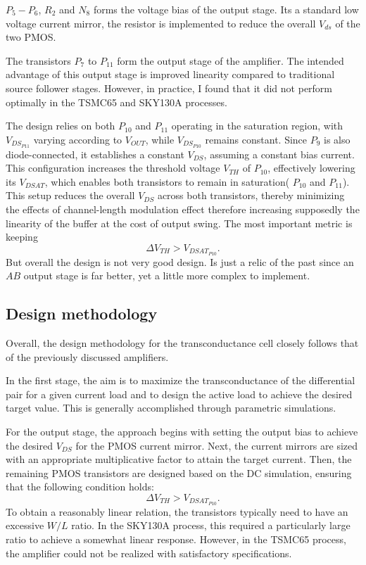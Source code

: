 \documentclass[12pt]{article}
\begin{document}
$P_5 - P_6$, $R_2$ and $N_8$ forms the voltage bias of the output stage. Its a standard low voltage current mirror, the resistor is implemented to reduce the overall $V_{ds}$ of the two PMOS.

The transistors $P_7$ to $P_{11}$ form the output stage of the amplifier. The intended advantage of this output stage is improved linearity compared to traditional source follower stages. However, in practice, I found that it did not perform optimally in the TSMC65 and SKY130A processes.

The design relies on both $P_{10}$ and $P_{11}$ operating in the saturation region, with $V_{DS_{P11}}$ varying according to $V_{OUT}$, while $V_{DS_{P10}}$ remains constant. Since $P_9$ is also diode-connected, it establishes a constant $V_{DS}$, assuming a constant bias current. This configuration increases the threshold voltage $V_{TH}$ of $P_{10}$, effectively lowering its $V_{DSAT}$, which enables both transistors to remain in saturation( $P_{10}$ and $P_{11}$). This setup reduces the overall $V_{DS}$ across both transistors, thereby minimizing the effects of channel-length modulation effect therefore increasing supposedly the linearity of the buffer at the cost of output swing.
The most important metric is keeping
\begin{equation}
    \Delta V_{TH} > V_{DSAT_{P10}}.
\end{equation}
But overall the design is not very good design. Is just  a relic of the past since an $AB$ output stage is far better, yet a little more complex to implement.


\subsection{Design methodology}
Overall, the design methodology for the transconductance cell closely follows that of the previously discussed amplifiers.

In the first stage, the aim is to maximize the transconductance of the differential pair for a given current load and to design the active load to achieve the desired target value. This is generally accomplished through parametric simulations.

For the output stage, the approach begins with setting the output bias to achieve the desired $V_{DS}$ for the PMOS current mirror. Next, the current mirrors are sized with an appropriate multiplicative factor to attain the target current. Then, the remaining PMOS transistors are designed based on the DC simulation, ensuring that the following condition holds:
\begin{equation}
    \Delta V_{TH} > V_{DSAT_{P10}}.
\end{equation}
To obtain a reasonably linear relation, the transistors typically need to have an excessive \( W/L \) ratio. In the SKY130A process, this required a particularly large ratio to achieve a somewhat linear response. However, in the \ac{TSMC65} process, the amplifier could not be realized with satisfactory specifications.
\newpage
\end{document}
